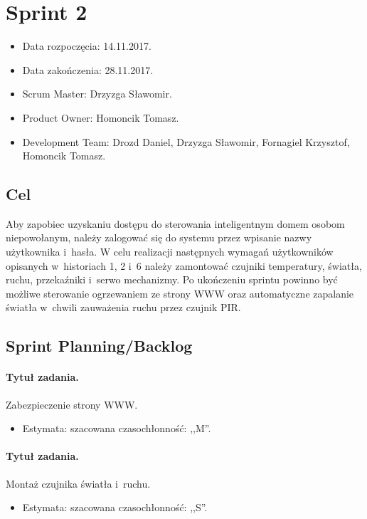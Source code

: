 \section{Sprint 2}
\begin{itemize}
	\item Data rozpoczęcia: 14.11.2017.
	\item Data zakończenia: 28.11.2017.
	\item Scrum Master: Drzyzga Sławomir.
	\item Product Owner: Homoncik Tomasz.
	\item Development Team: Drozd Daniel, Drzyzga Sławomir, Fornagiel Krzysztof, Homoncik Tomasz.
\end{itemize}
\subsection{Cel} 


Aby zapobiec uzyskaniu dostępu do sterowania inteligentnym domem osobom niepowołanym, należy zalogować się do systemu przez wpisanie nazwy użytkownika i~hasła. W celu realizacji następnych wymagań użytkowników opisanych w~historiach 1, 2 i~6 należy zamontować czujniki temperatury, światła, ruchu, przekaźniki i~serwo mechanizmy. Po ukończeniu sprintu powinno być możliwe sterowanie ogrzewaniem ze strony WWW oraz automatyczne zapalanie światła w~chwili zauważenia ruchu przez czujnik PIR. 



\subsection{Sprint Planning/Backlog}

\paragraph{Tytuł zadania.} Zabezpieczenie strony WWW.
\begin{itemize}
	\item Estymata: szacowana czasochłonność: ,,M''.
\end{itemize}

\paragraph{Tytuł zadania.} Montaż czujnika światła i~ruchu.
\begin{itemize}
	\item Estymata: szacowana czasochłonność: ,,S''.
\end{itemize}

